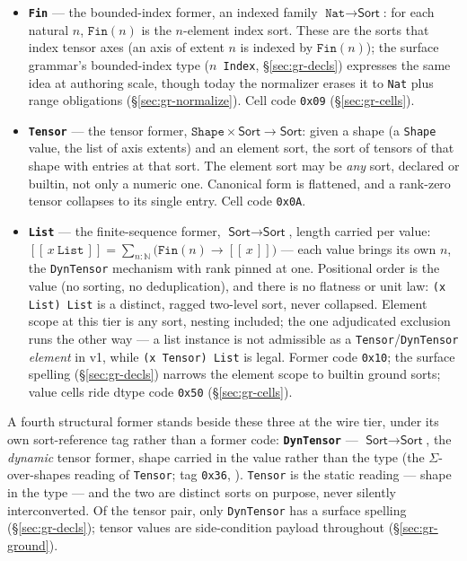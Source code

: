 \begin{itemize}
\item \textbf{\texttt{Fin}} — the bounded-index former, an indexed
family $\texttt{Nat} \to \textsf{Sort}$: for each natural $n$,
$\texttt{Fin}(n)$ is the $n$-element index sort. These are the sorts
that index tensor axes (an axis of extent $n$ is indexed by
$\texttt{Fin}(n)$); the surface grammar's bounded-index type
(\texttt{$n$ Index}, \S\ref{sec:gr-decls}) expresses the same idea
at authoring scale, though today the normalizer erases it to
\texttt{Nat} plus range obligations (\S\ref{sec:gr-normalize}).
Cell code \texttt{0x09} (\S\ref{sec:gr-cells}).
\item \textbf{\texttt{Tensor}} — the tensor former,
$\texttt{Shape} \times \textsf{Sort} \to \textsf{Sort}$: given a
shape (a \texttt{Shape} value, the list of axis extents) and an
element sort, the sort of tensors of that shape with entries at that
sort. The element sort may be \emph{any} sort, declared or builtin,
not only a numeric one. Canonical form is flattened, and a rank-zero
tensor collapses to its single entry. Cell code \texttt{0x0A}.
\item \textbf{\texttt{List}} — the finite-sequence former,
$\textsf{Sort} \to \textsf{Sort}$, length carried per value:
$[\![\, x\ \texttt{List} \,]\!] = \sum_{n:\mathbb{N}}
\bigl(\texttt{Fin}(n) \to [\![\, x \,]\!]\bigr)$ — each value brings
its own $n$, the \texttt{DynTensor} mechanism with rank pinned at
one. Positional order is the value (no sorting, no deduplication),
and there is no flatness or unit law: \texttt{(x List) List} is a
distinct, ragged two-level sort, never collapsed. Element scope at
this tier is any sort, nesting included; the one adjudicated
exclusion runs the other way — a list instance is not admissible as
a \texttt{Tensor}/\texttt{DynTensor} \emph{element} in v1, while
\texttt{(x Tensor) List} is legal. Former code \texttt{0x10}; the
surface spelling (\S\ref{sec:gr-decls}) narrows the element scope to
builtin ground sorts; value cells ride dtype code \texttt{0x50}
(\S\ref{sec:gr-cells}).
\end{itemize}

\noindent A fourth structural former stands beside these three at the
wire tier, under its own sort-reference tag rather than a former
code: \textbf{\texttt{DynTensor}} — $\textsf{Sort} \to
\textsf{Sort}$, the \emph{dynamic} tensor former, shape carried in
the value rather than the type (the $\Sigma$-over-shapes reading of
\texttt{Tensor}; tag \texttt{0x36},
). \texttt{Tensor} is the
static reading — shape in the type — and the two are distinct sorts
on purpose, never silently interconverted. Of the tensor pair, only
\texttt{DynTensor} has a surface spelling
(\S\ref{sec:gr-decls}); tensor values are side-condition payload
throughout (\S\ref{sec:gr-ground}).


